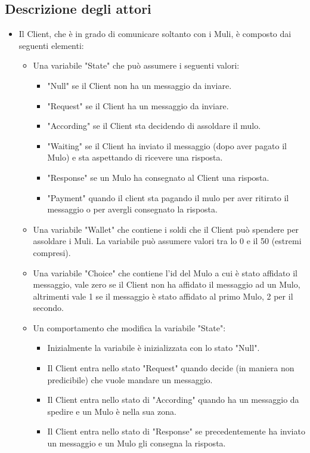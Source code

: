\documentclass[13pt,a4paper]{article}
\begin{document}
	\subsection{Descrizione degli attori}
	\begin{itemize}
		\item Il Client, che è in grado di comunicare soltanto con i Muli, è composto dai seguenti elementi:
		\begin{itemize}
			\item Una variabile "State" che può assumere i seguenti valori:
			\begin{itemize}
				\item "Null" se il Client non ha un messaggio da inviare.
				\item "Request" se il Client ha un messaggio da inviare.
				\item "According" se il Client sta decidendo di assoldare il mulo.
				\item "Waiting" se il Client ha inviato il messaggio (dopo aver pagato il Mulo) e sta aspettando di ricevere una risposta.
				\item "Response" se un Mulo ha consegnato al Client una risposta.
				\item "Payment" quando il client sta pagando il mulo per aver ritirato il messaggio o per avergli consegnato la risposta.
			\end{itemize}
			\item Una variabile "Wallet" che contiene i soldi che il Client può spendere per assoldare i Muli. La variabile può assumere valori tra lo 0 e il 50 (estremi compresi).
			\item Una variabile "Choice" che contiene l'id del Mulo a cui è stato affidato il messaggio, vale zero se il Client non ha  affidato il messaggio ad un Mulo, altrimenti vale 1 se il messaggio è stato affidato al primo Mulo, 2 per il secondo.
			\item Un comportamento che modifica la variabile "State":
			\begin{itemize}
				\item Inizialmente la variabile è inizializzata con lo stato "Null".
				\item Il Client entra nello stato "Request" quando decide (in maniera non predicibile) che vuole mandare un messaggio.
				\item Il Client entra nello stato di "According" quando ha un messaggio da spedire e un Mulo è nella sua zona.
				\item Il Client entra nello stato di "Response" se precedentemente ha inviato un messaggio e un Mulo gli consegna la risposta.

\end{itemize}
\end{itemize}
\end{itemize}
\end{document}
